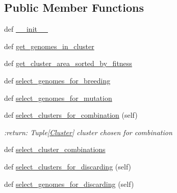 \subsection*{Public Member Functions}
\begin{DoxyCompactItemize}
\item 
def \hyperlink{classNEAT__PyGenetics_1_1NEAT_1_1Analyst_1_1GenomeSelector_1_1GenomeSelector_a92cb92afdabf4246963cf8214c9baa76}{\+\_\+\+\_\+init\+\_\+\+\_\+}
\item 
def \hyperlink{classNEAT__PyGenetics_1_1NEAT_1_1Analyst_1_1GenomeSelector_1_1GenomeSelector_aae7092166920c907176530a60deda37d}{get\+\_\+genomes\+\_\+in\+\_\+cluster}
\item 
def \hyperlink{classNEAT__PyGenetics_1_1NEAT_1_1Analyst_1_1GenomeSelector_1_1GenomeSelector_a2fb8600454d9d808158dbe3ace6b4952}{get\+\_\+cluster\+\_\+area\+\_\+sorted\+\_\+by\+\_\+fitness}
\item 
def \hyperlink{classNEAT__PyGenetics_1_1NEAT_1_1Analyst_1_1GenomeSelector_1_1GenomeSelector_a938d385b8d73983a5e9abf75a80f03f5}{select\+\_\+genomes\+\_\+for\+\_\+breeding}
\item 
def \hyperlink{classNEAT__PyGenetics_1_1NEAT_1_1Analyst_1_1GenomeSelector_1_1GenomeSelector_af335a5342b0a1695c52d61274c83b0bf}{select\+\_\+genomes\+\_\+for\+\_\+mutation}
\item 
def \hyperlink{classNEAT__PyGenetics_1_1NEAT_1_1Analyst_1_1GenomeSelector_1_1GenomeSelector_a9e1d64bae210147a47049f1c8c389bfc}{select\+\_\+clusters\+\_\+for\+\_\+combination} (self)
\begin{DoxyCompactList}\small\item\em \+:return\+: Tuple\mbox{[}\hyperlink{namespaceNEAT__PyGenetics_1_1NEAT_1_1Analyst_1_1Cluster}{Cluster}\mbox{]} cluster chosen for combination \end{DoxyCompactList}\item 
def \hyperlink{classNEAT__PyGenetics_1_1NEAT_1_1Analyst_1_1GenomeSelector_1_1GenomeSelector_a08b5d1264a5dadc1ec98affabf1ab76d}{select\+\_\+cluster\+\_\+combinations}
\item 
def \hyperlink{classNEAT__PyGenetics_1_1NEAT_1_1Analyst_1_1GenomeSelector_1_1GenomeSelector_a1016a10b5301bd2a1fd770dceda6644b}{select\+\_\+clusters\+\_\+for\+\_\+discarding} (self)
\item 
def \hyperlink{classNEAT__PyGenetics_1_1NEAT_1_1Analyst_1_1GenomeSelector_1_1GenomeSelector_af7cd898b9a5bbc1e2e407256a385f865}{select\+\_\+genomes\+\_\+for\+\_\+discarding} (self)
\end{DoxyCompactItemize}
